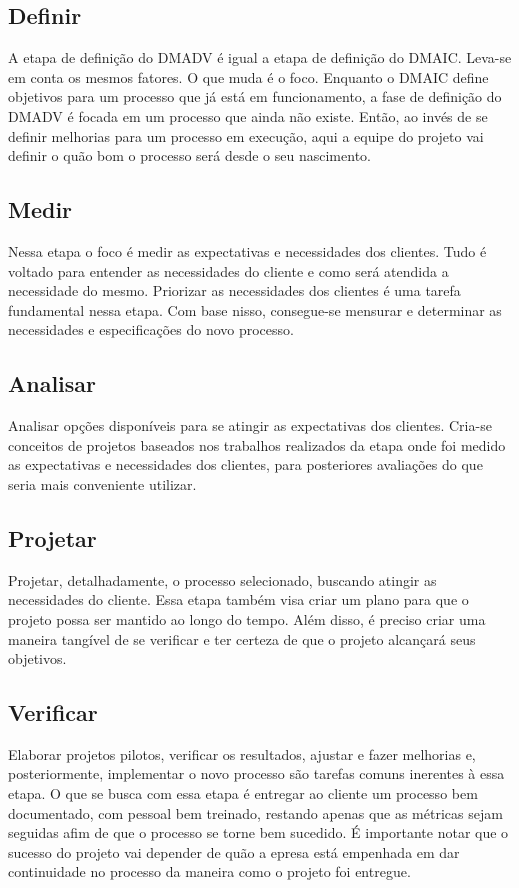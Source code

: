 \documentclass{abnt}
\begin{document}
				\subsection {Definir}
				A etapa de definição do DMADV é igual a etapa de definição do DMAIC. Leva-se em conta os mesmos fatores.
				O que muda é o foco. Enquanto o DMAIC define objetivos para um processo que já está em funcionamento, 
				a fase de definição do DMADV é focada em um processo que ainda não existe. Então, ao invés de se definir 
				melhorias para um processo em execução, aqui a equipe do projeto vai definir o quão bom o processo será desde 
				o seu nascimento.
				\subsection {Medir}
				Nessa etapa o foco é medir as expectativas e necessidades dos clientes. Tudo é voltado para 
				entender as necessidades do cliente e como será atendida a necessidade do mesmo.
				Priorizar as necessidades dos clientes é uma tarefa fundamental nessa etapa.
				Com base nisso, consegue-se mensurar e determinar as necessidades e especificações do novo processo.
				\subsection {Analisar}
				Analisar opções disponíveis para se atingir as expectativas dos clientes. Cria-se conceitos de projetos baseados 
				nos trabalhos realizados da etapa onde foi medido as expectativas e necessidades dos clientes, 
				para posteriores avaliações do que seria mais conveniente utilizar.
				\subsection {Projetar}
				Projetar, detalhadamente, o processo selecionado, buscando atingir as necessidades do cliente. 
				Essa etapa também visa criar um plano para que o projeto possa ser mantido ao longo do tempo. Além disso, 
				é preciso criar uma maneira tangível de se verificar e ter certeza de que o projeto alcançará seus objetivos.
				\subsection {Verificar}
				Elaborar projetos pilotos, verificar os resultados, ajustar e fazer melhorias
				e, posteriormente, implementar o novo processo são tarefas comuns inerentes à essa etapa. O que se busca 
				com essa etapa é entregar ao cliente um processo bem documentado, com pessoal bem treinado, restando apenas 
				que as métricas sejam seguidas afim de que o processo se torne bem sucedido. 
				É importante notar que o sucesso do projeto vai depender de quão a epresa está empenhada em dar continuidade 
				no processo da maneira como o projeto foi entregue.
\end{document}
